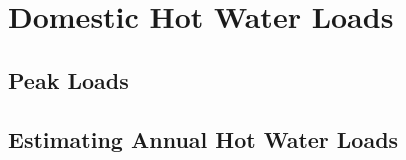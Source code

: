 \chapter{Domestic Hot Water Loads}
\label{chp:DHWLoads}

\section{Peak Loads}



\section{Estimating Annual Hot Water Loads}